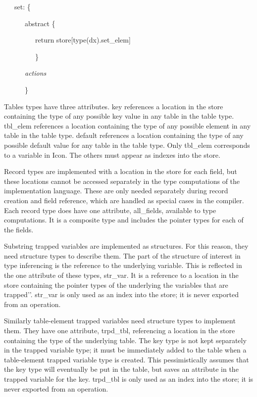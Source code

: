 {\ttfamily\mdseries
\ \ \ set: \{}

{\ttfamily\mdseries
\ \ \ \ \ \ abstract \{}

{\ttfamily\mdseries
\ \ \ \ \ \ \ \ \ return store[type(dx).set\_elem]}

{\ttfamily\mdseries
\ \ \ \ \ \ \ \ \ \}}

{\ttfamily\mdseries
\ \ \ \ \ \ \textit{actions}}

{\ttfamily\mdseries
\ \ \ \ \ \ \}}

Tables types have three attributes. key references a location in the
store containing the type of any possible key value in any table in
the table type. tbl\_elem references a location containing the type of
any possible element in any table in the table type. default
references a location containing the type of any possible default
value for any table in the table type. Only tbl\_elem corresponds to a
variable in Icon. The others must appear as indexes into the store.

Record types are implemented with a location in the store for each
field, but these locations cannot be accessed separately in the type
computations of the implementation language. These are only needed
separately during record creation and field reference, which are
handled as special cases in the compiler. Each record type does have
one attribute, all\_fields, available to type computations. It is a
composite type and includes the pointer types for each of the fields.

Substring trapped variables are implemented as structures. For this
reason, they need structure types to describe them.  The part of the
structure of interest in type inferencing is the reference to the
underlying variable. This is reflected in the one attribute of these
types, str\_var. It is a reference to a location in the store
containing the pointer types of the underlying the variables that are
{\textasciigrave}{\textasciigrave}trapped'{}'. str\_var is only used
as an index into the store; it is never exported from an operation.

Similarly table-element trapped variables need structure types to
implement them. They have one attribute, trpd\_tbl, referencing a
location in the store containing the type of the underlying table. The
key type is not kept separately in the trapped variable type; it must
be immediately added to the table when a table-element trapped
variable type is created. This pessimistically assumes that the key
type will eventually be put in the table, but saves an attribute in
the trapped variable for the key. trpd\_tbl is only used as an index
into the store; it is never exported from an operation.

